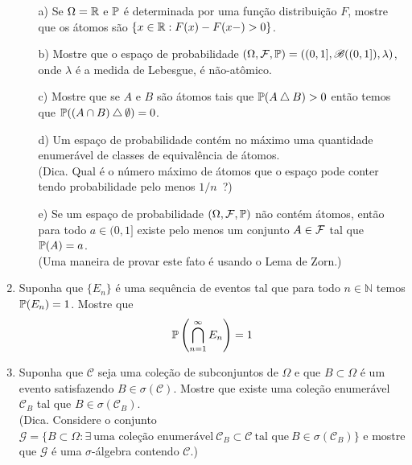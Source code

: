 \begin{enumerate}[leftmargin=*]
	\begin{itemize}
		\item[a)]
		Se $\Omega=\R$ e $\P$ é determinada por uma 
		função distribuição $F$, mostre que os átomos
		são $\{x\in\R: F(x)-F(x-)>0\}$.
				
		\item[b)]
		Mostre que o espaço de probabilidade  
		$(\Omega,\F,\P)=((0,1],\mathscr{B}((0,1]),\lambda)$,
		onde $\lambda$ é a medida de Lebesgue, é não-atômico. 

		\item[c)]
		Mostre que se $A$ e $B$ são átomos tais que
		$\P(A\bigtriangleup B)>0$ então temos que
		$\P((A\cap B) \bigtriangleup \emptyset)=0$.


		\item[d)] 
		Um espaço de probabilidade contém no máximo 
		uma quantidade enumerável de classes de equivalência de átomos. 
		\\
		(Dica. Qual é o número máximo de átomos que o
		espaço pode conter tendo probabilidade pelo menos $1/n$\ ?)
		
		
		\item[e)]
		Se um espaço de probabilidade $(\Omega,\F,\P)$
		não contém átomos, então para todo $a\in (0,1]$
		existe pelo menos um conjunto $A\in\F$ tal que 
		$\P(A)=a$. 
		\\
		(Uma maneira de provar este fato é usando o Lema de Zorn.)
	\end{itemize}






\item
Suponha que $\{E_n\}$ é uma sequência de eventos tal que
para todo $n\in\mathbb{N}$ temos $\P(E_n)=1$. Mostre que 
\[	
	\P\left(  \bigcap_{n=1}^{\infty} E_n\right) =1 
\]






\item
Suponha que $\mathcal{C}$ seja uma coleção de subconjuntos de 
$\Omega$ e que $B\subset \Omega$ é um evento satisfazendo
$B\in\sigma(\mathcal{C})$.
Mostre que existe uma coleção enumerável $\mathcal{C}_{B}$
tal que $B\in \sigma(\mathcal{C}_{B})$.
\\
(Dica. Considere o conjunto 
$\mathcal{G}=\{ B\subset\Omega: \exists\ \text{uma coleção enumerável}\ 
\mathcal{C}_B\subset \mathcal{C}\ 
\text{tal que}\ B\in\sigma(\mathcal{C}_{B}) \}
$
e mostre que $\mathcal{G}$ é uma $\sigma$-álgebra contendo
$\mathcal{C}$.)








\end{enumerate}
